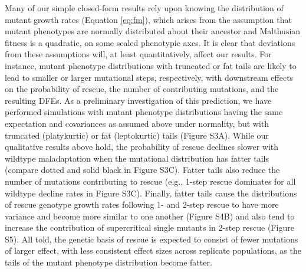 \documentclass[9pt,twocolumn,twoside,lineno]{gsajnl}
\begin{document}
Many of our simple closed-form results rely upon knowing the distribution of mutant growth rates (Equation \ref{eq:fm}), which arises from the assumption that mutant phenotypes are normally distributed about their ancestor and Malthusian fitness is a quadratic, on some scaled phenotypic axes.
It is clear that deviations from these assumptions will, at least quantitatively, affect our results.
For instance, mutant phenotype distributions with truncated or fat tails are likely to lead to smaller or larger mutational steps, respectively, with downstream effects on the probability of rescue, the number of contributing mutations, and the resulting DFEs. 
As a preliminary investigation of this prediction, we have performed simulations with mutant phenotype distributions having the same expectation and covariances as assumed above under normality, but with truncated (platykurtic) or fat (leptokurtic) tails (Figure S3A).
While our qualitative results above hold, the probability of rescue declines slower with wildtype maladaptation when the mutational distribution has fatter tails (compare dotted and solid black in Figure S3C).
Fatter tails also reduce the number of mutations contributing to rescue (e.g., 1-step rescue dominates for all wildtype decline rates in Figure S3C).
Finally, fatter tails cause the distributions of rescue genotype growth rates following 1- and 2-step rescue to have more variance and become more similar to one another (Figure S4B) and also tend to increase the contribution of supercritical single mutants in 2-step rescue (Figure S5).
All told, the genetic basis of rescue is expected to consist of fewer mutations of larger effect, with less consistent effect sizes across replicate populations, as the tails of the mutant phenotype distribution become fatter.
\end{document}
